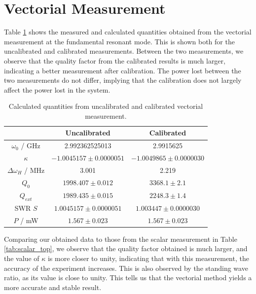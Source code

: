\documentclass[a4paper]{report}
\numberwithin{equation}{section}
\begin{document}
\section{Vectorial Measurement}

Table \ref{tab:vectorial} shows the measured and calculated quantities obtained from the vectorial measurement at the fundamental resonant mode. This is 
shown both for the uncalibrated and calibrated measurements. Between the two measurements, we observe that the quality factor from the calibrated results
is much larger, indicating a better measurement after calibration. The power lost between the two measurements do not differ, implying that the calibration
does not largely affect the power lost in the system. \par 

\begin{table}[h!]
	\centering
	\begin{tabular}{|c|c|c|}
		\hline  & Uncalibrated & Calibrated \\ 
		\hline $\omega_0$ / GHz & 2.992362525013 & 2.9915625 \\
		\hline $\kappa$ & $-1.0045157 \pm 0.0000051$ & $-1.0049865\pm 0.0000030$ \\
		\hline $\Delta\omega_H$ / MHz & 3.001 & 2.219 \\
		\hline $Q_0$  & $1998.407 \pm 0.012$  & $3368.1 \pm 2.1$  \\
		\hline $Q_{ext}$ & $1989.435 \pm 0.015$ & $2248.3 \pm 1.4$ \\
		\hline SWR $S$ & $1.0045157 \pm 0.0000051$ & $1.003447 \pm 0.0000030$ \\
		\hline $P$ / mW & $1.567 \pm 0.023$ & $1.567 \pm 0.023$\\ 
		\hline   
	\end{tabular}
	\caption{Calculated quantities from uncalibrated and calibrated vectorial measurement. }
	\label{tab:vectorial}
\end{table}

Comparing our obtained data to those from the scalar measurement in Table \ref{tab:scalar_top}, we observe that the quality factor obtained is much larger, and the value of $\kappa$ is more
closer to unity, indicating that with this measurement, the accuracy of the experiment increases. This is also observed by the standing wave ratio, as its value is close to unity. This tells
us that the vectorial method yields a more accurate and stable result. \par

\end{document}
